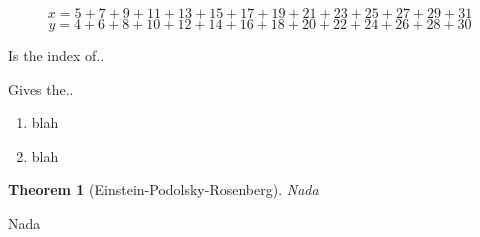 \documentclass[9pt,technote]{IEEEtran}
\begin{document}

\begin{figure*}[!t]
\normalsize
\setcounter{MYtempeqncnt}{\value{equation}}
\setcounter{equation}{5}
\begin{equation}
\label{eqn_dbl_x}
x = 5 + 7 + 9 + 11 + 13 + 15 + 17 + 19 + 21+ 23 + 25
+ 27 + 29 + 31
\end{equation}
\begin{equation}
\label{eqn_dbl_y}
y = 4 + 6 + 8 + 10 + 12 + 14 + 16 + 18 + 20+ 22 + 24
+ 26 + 28 + 30
\end{equation}
\setcounter{equation}{\value{MYtempeqncnt}}
\hrulefill
\vspace*{4pt}
\end{figure*}



\begin{description}[\IEEEsetlabelwidth{$\alpha\omega\pi\theta\mu$}\IEEEusemathlabelsep]
\item[$\gamma\delta\beta$] Is the index of..
\item[$\alpha\omega\pi\theta\mu$] Gives the..
\end{description}



\begin{enumerate}[\IEEEsetlabelwidth{2)}]
\item blah
\item blah
\end{enumerate}



\newtheorem{theorem}{Theorem}
\begin{theorem}[Einstein-Podolsky-Rosenberg]
Nada
\end{theorem}
\begin{IEEEproof}
Nada
\end{IEEEproof}
\end{document}
